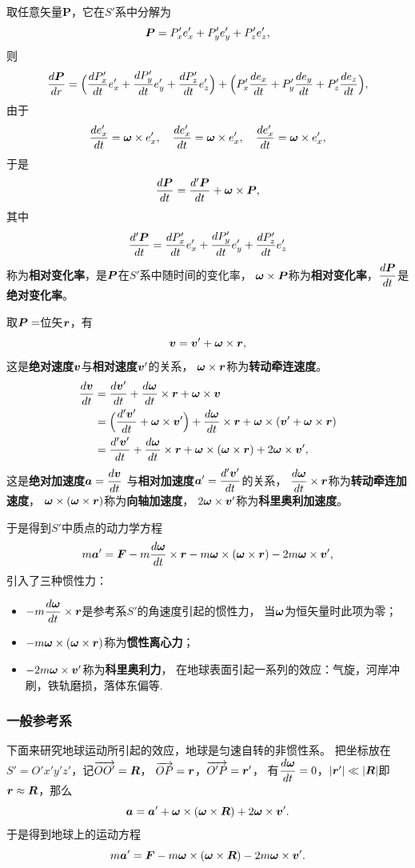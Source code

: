取任意矢量$\boldsymbol{P}$，它在$S'$系中分解为
$$\pp=P_x'e_x'+P_y'e_y'+P_z'e_z',$$
则
$$\frac{d\pp}{dr}
=\Big(\frac{dP_x'}{dt}e_x'+\frac{dP_y'}{dt}e_y'+\frac{dP_z'}{dt}e_z'\Big)
+\Big(P_x'\frac{de_x}{dt}+P_y'\frac{de_y}{dt}+P_z'\frac{de_z}{dt}\Big),$$
由于
$$\frac{de_x'}{dt}=\o\times e_x',\quad
\frac{de_x'}{dt}=\o\times e_x',\quad
\frac{de_x'}{dt}=\o\times e_x',$$
于是
$$\frac{d\pp}{dt}=\frac{d'\pp}{dt}+\o\times\pp,$$
其中
$$\frac{d'\pp}{dt}=\frac{dP_x'}{dt}e_x'+\frac{dP_y'}{dt}e_y'+\frac{dP_z'}{dt}e_z'$$
称为\textbf{相对变化率}，是$\pp$在$S'$系中随时间的变化率，
$\o\times\pp$称为\textbf{相对变化率}，$\dis \frac{d\pp}{dt}$是\textbf{绝对变化率}。

取$\pp=$位矢$\r$，有
$$\v=\v'+\o\times\r,$$
这是\textbf{绝对速度}$\v$与\textbf{相对速度}$\v'$的关系，
$\o\times\r$称为\textbf{转动牵连速度}。
\begin{align*}
    \frac{d\v}{dt}&=\frac{d\v'}{dt}+\frac{d\o}{dt}\times\r+\o\times\v\\
    &=\Big(\frac{d'\v'}{dt}+\o\times\v'\Big)+\frac{d\o}{dt}\times\r
    +\o\times(\v'+\o\times\r)\\
    &=\frac{d'\v'}{dt}+\frac{d\o}{dt}\times\r
    +\o\times(\o\times\r)+2\o\times\v',
\end{align*}
这是\textbf{绝对加速度}$\dis \a=\frac{d\v}{dt}$
与\textbf{相对加速度}$\dis \a'=\frac{d'\v'}{dt}$的关系，
$\dis \frac{d\o}{dt}\times\r$称为\textbf{转动牵连加速度}，
$\o\times(\o\times\r)$称为\textbf{向轴加速度}，
$2\o\times\v'$称为\textbf{科里奥利加速度}。

于是得到$S'$中质点的动力学方程
$$m\a'=\F-m\frac{d\o}{dt}\times\r
-m\o\times(\o\times\r)-2m\o\times\v',$$
引入了三种惯性力：
\begin{itemize}
        \item[$\circ$] $\dis -m\frac{d\o}{dt}\times\r$是参考系$S'$的角速度引起的惯性力，
        当$\o$为恒矢量时此项为零；
        \item[$\circ$] $-m\o\times(\o\times\r)$称为\textbf{惯性离心力}；
        \item[$\circ$] $-2m\o\times\v'$称为\textbf{科里奥利力}，
        在地球表面引起一系列的效应：气旋，河岸冲刷，铁轨磨损，落体东偏等.
\end{itemize}
\subsubsection*{一般参考系}
下面来研究地球运动所引起的效应，地球是匀速自转的非惯性系。
把坐标放在$S'=O'x'y'z'$，记$\overrightarrow{OO'}=\rr$，
$\overrightarrow{OP}=\r$，$\overrightarrow{O'P}=\r'$，
有$\dis \frac{d\o}{dt}=0$，$|\r'|\ll|\rr|$即$\r\approx\rr$，那么
$$\a=\a'+\o\times(\o\times\rr)+2\o\times\v'.$$
于是得到地球上的运动方程
$$m\a'=\F-m\o\times(\o\times\rr)-2m\o\times\v'.$$

